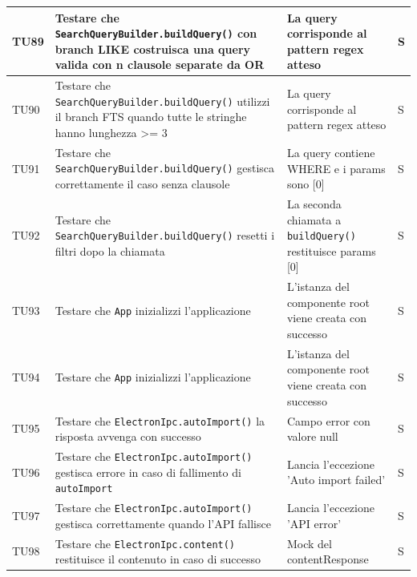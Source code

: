 \documentclass[a4paper,12pt]{article}
\begin{document}
\begin{longtable}{|M{1.2cm}|M{5cm}|M{7cm}|M{1.5cm}|}
            TU89 & Testare che \texttt{SearchQueryBuilder.buildQuery()} con branch LIKE costruisca una query valida con n clausole separate da OR & La query corrisponde al pattern regex atteso & S \\
            \hline

            TU90 & Testare che \texttt{SearchQueryBuilder.buildQuery()} utilizzi il branch FTS quando tutte le stringhe hanno lunghezza >= 3 & La query corrisponde al pattern regex atteso & S \\
            \hline

            TU91 & Testare che \texttt{SearchQueryBuilder.buildQuery()} gestisca correttamente il caso senza clausole & La query contiene WHERE e i params sono [0] & S \\
            \hline

            TU92 & Testare che \texttt{SearchQueryBuilder.buildQuery()} resetti i filtri dopo la chiamata & La seconda chiamata a \texttt{buildQuery()} restituisce params [0] & S \\
            \hline

            TU93 & Testare che \texttt{App} inizializzi l'applicazione & L'istanza del componente root viene creata con successo & S \\
            \hline

            TU94 & Testare che \texttt{App} inizializzi l'applicazione & L'istanza del componente root viene creata con successo & S \\
            \hline

            TU95 & Testare che \texttt{ElectronIpc.autoImport()} la risposta avvenga con successo & Campo error con valore null & S \\
            \hline

            TU96 & Testare che \texttt{ElectronIpc.autoImport()} gestisca errore in caso di fallimento di \texttt{autoImport} & Lancia l'eccezione 'Auto import failed' & S \\
            \hline

            TU97 & Testare che \texttt{ElectronIpc.autoImport()} gestisca correttamente quando l'API fallisce & Lancia l'eccezione 'API error' & S \\
            \hline

            TU98 & Testare che \texttt{ElectronIpc.content()} restituisce il contenuto in caso di successo & Mock del contentResponse & S \\
            \hline


\end{longtable}
\end{document}
